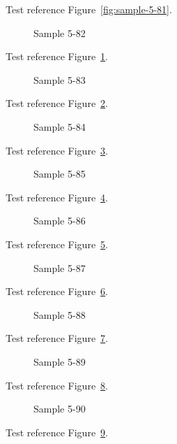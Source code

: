 Test reference Figure~\ref{fig:sample-5-81}.

\begin{figure}[tbhp]
\caption{Sample 5-82}
\label{fig:sample-5-82}
\end{figure}

Test reference Figure~\ref{fig:sample-5-82}.

\begin{figure}[tbhp]
\caption{Sample 5-83}
\label{fig:sample-5-83}
\end{figure}

Test reference Figure~\ref{fig:sample-5-83}.

\begin{figure}[tbhp]
\caption{Sample 5-84}
\label{fig:sample-5-84}
\end{figure}

Test reference Figure~\ref{fig:sample-5-84}.

\begin{figure}[tbhp]
\caption{Sample 5-85}
\label{fig:sample-5-85}
\end{figure}

Test reference Figure~\ref{fig:sample-5-85}.

\begin{figure}[tbhp]
\caption{Sample 5-86}
\label{fig:sample-5-86}
\end{figure}

Test reference Figure~\ref{fig:sample-5-86}.

\begin{figure}[tbhp]
\caption{Sample 5-87}
\label{fig:sample-5-87}
\end{figure}

Test reference Figure~\ref{fig:sample-5-87}.

\begin{figure}[tbhp]
\caption{Sample 5-88}
\label{fig:sample-5-88}
\end{figure}

Test reference Figure~\ref{fig:sample-5-88}.

\begin{figure}[tbhp]
\caption{Sample 5-89}
\label{fig:sample-5-89}
\end{figure}

Test reference Figure~\ref{fig:sample-5-89}.

\begin{figure}[tbhp]
\caption{Sample 5-90}
\label{fig:sample-5-90}
\end{figure}

Test reference Figure~\ref{fig:sample-5-90}.

